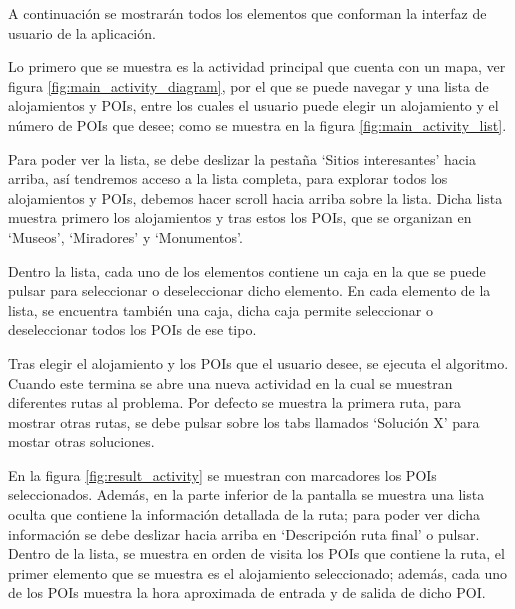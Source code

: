 A continuación se mostrarán todos los elementos que conforman la interfaz de usuario de la aplicación.\newline

Lo primero que se muestra es la actividad principal que cuenta con un mapa, ver figura \ref{fig:main_activity_diagram}, por el que se puede navegar y una lista de alojamientos y POIs, entre los cuales el usuario puede elegir un alojamiento y el número de POIs que desee; como se muestra en la figura \ref{fig:main_activity_list}.\newline

Para poder ver la lista, se debe deslizar la pestaña \enquote*{Sitios interesantes} hacia arriba, así tendremos acceso a la lista completa, para explorar todos los alojamientos y POIs, debemos hacer scroll hacia arriba sobre la lista. Dicha lista muestra primero los alojamientos y tras estos los POIs, que se organizan en \enquote*{Museos}, \enquote*{Miradores} y \enquote*{Monumentos}.\newline

Dentro la lista, cada uno de los elementos contiene un caja en la que se puede pulsar para seleccionar o deseleccionar dicho elemento. En cada elemento de la lista, se encuentra también una caja, dicha caja permite seleccionar o deseleccionar todos los POIs de ese tipo.\newline

Tras elegir el alojamiento y los POIs que el usuario desee, se ejecuta el algoritmo. Cuando este termina se abre una nueva actividad en la cual se muestran diferentes rutas al problema. Por defecto se muestra la primera ruta, para mostrar otras rutas, se debe pulsar sobre los tabs llamados \enquote*{Solución X} para mostar otras soluciones.\newline

En la figura \ref{fig:result_activity} se muestran con marcadores los POIs seleccionados. Además, en la parte inferior de la pantalla se muestra una lista oculta que contiene la información detallada de la ruta; para poder ver dicha información se debe deslizar hacia arriba en \enquote*{Descripción ruta final} o pulsar. Dentro de la lista, se muestra en orden de visita los POIs que contiene la ruta, el primer elemento que se muestra es el alojamiento seleccionado; además, cada uno de los POIs muestra la hora aproximada de entrada y de salida de dicho POI.

